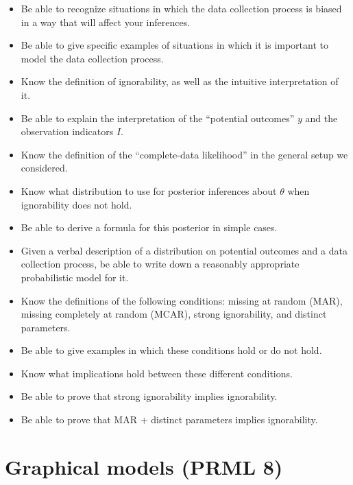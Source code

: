 \documentclass[12pt]{article}
\begin{document}
\begin{itemize}
\item Be able to recognize situations in which the data collection process is biased in a way that will affect your inferences.
\item Be able to give specific examples of situations in which it is important to model the data collection process.
\item Know the definition of ignorability, as well as the intuitive interpretation of it.
\item Be able to explain the interpretation of the ``potential outcomes'' $y$ and the observation indicators $I$.
\item Know the definition of the ``complete-data likelihood'' in the general setup we considered.
\item Know what distribution to use for posterior inferences about $\theta$ when ignorability does not hold.
\item Be able to derive a formula for this posterior in simple cases.
\item Given a verbal description of a distribution on potential outcomes and a data collection process, be able to write down a reasonably appropriate probabilistic model for it.
\item Know the definitions of the following conditions: missing at random (MAR), missing completely at random (MCAR), strong ignorability, and distinct parameters.
\item Be able to give examples in which these conditions hold or do not hold.
\item Know what implications hold between these different conditions.
\item Be able to prove that strong ignorability implies ignorability.
\item Be able to prove that MAR + distinct parameters implies ignorability.
\end{itemize}



\section{Graphical models (PRML 8)}
\end{document}
